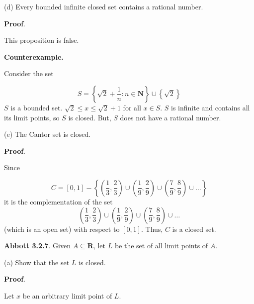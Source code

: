 \documentclass[10pt]{article}
\begin{document}
(d) Every bounded infinite closed set contains a rational number.



\textbf{Proof}.



This proposition is false.



\textbf{Counterexample.}



Consider the set 


\begin{equation*}
S=\left\{\sqrt{2} +\frac{1}{n} :n\in \mathbf{N}\right\} \cup \left\{\sqrt{2}\right\}
\end{equation*}
$\displaystyle S$ is a bounded set. $\displaystyle \sqrt{2} \leq x\leq \sqrt{2} +1$ for all $\displaystyle x\in S$. $\displaystyle S$ is infinite and contains all its limit points, so $\displaystyle S$ is closed. But, $\displaystyle S$ does not have a rational number.



(e) The Cantor set is closed.



\textbf{Proof}.



Since 


\begin{equation*}
C=[ 0,1] -\left\{\left(\frac{1}{3} ,\frac{2}{3}\right) \cup \left(\frac{1}{9} ,\frac{2}{9}\right) \cup \left(\frac{7}{9} ,\frac{8}{9}\right) \cup \dotsc \right\}
\end{equation*}
it is the complementation of the set 
\begin{equation*}
\left(\frac{1}{3} ,\frac{2}{3}\right) \cup \left(\frac{1}{9} ,\frac{2}{9}\right) \cup \left(\frac{7}{9} ,\frac{8}{9}\right) \cup \dotsc 
\end{equation*}
(which is an open set) with respect to $\displaystyle [ 0,1]$. Thus, $\displaystyle C$ is a closed set.



\textbf{Abbott 3.2.7}. Given $\displaystyle A\subseteq \mathbf{R}$, let $\displaystyle L$ be the set of all limit points of $\displaystyle A$.



(a) Show that the set $\displaystyle L$ is closed.



\textbf{Proof}.



Let $\displaystyle x$ be an arbitrary limit point of $\displaystyle L$. 
\end{document}

